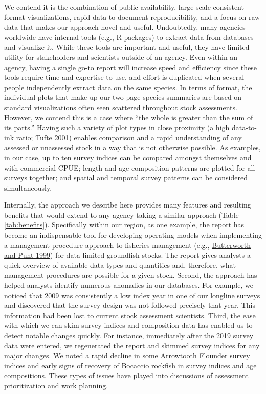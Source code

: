\documentclass[12pt,]{article}
\begin{document}
We contend it is the combination of public availability, large-scale consistent-format visualizations, rapid data-to-document reproducibility, and a focus on raw data that makes our approach novel and useful.
Undoubtedly, many agencies worldwide have internal tools (e.g., R packages) to extract data from databases and visualize it. While these tools are important and useful, they have limited utility for stakeholders and scientists outside of an agency. Even within an agency, having a single go-to report will increase speed and efficiency since
these tools require time and expertise to use, and effort is duplicated
when several people independently extract data on the same species.
In terms of format, the individual plots that make up our two-page species summaries are based on standard visualizations often seen scattered throughout stock assessments.
However, we contend this is a case where ``the whole is greater than the sum of its parts.''
Having such a variety of plot types in close proximity (a high data-to-ink ratio; \protect\hyperlink{ref-tufte2001}{Tufte 2001}) enables comparison and a rapid understanding of any assessed or unassessed stock in a way that is not otherwise possible.
As examples, in our case, up to ten survey indices can be compared amongst themselves and with commercial CPUE; length and age composition patterns are plotted for all surveys together; and spatial and temporal survey patterns can be considered simultaneously.

Internally, the approach we describe here provides many features and resulting benefits that would extend to any agency taking a similar approach (Table \ref{tab:benefits}).
Specifically within our region, as one example, the report has become an indispensable tool for developing operating models when implementing a management procedure approach to fisheries management (e.g., \protect\hyperlink{ref-butterworth1999}{Butterworth and Punt 1999}) for data-limited groundfish stocks.
The report gives analysts a quick overview of available data types and quantities and, therefore, what management procedures are possible for a given stock.
Second, the approach has helped analysts identify numerous anomalies in our databases.
For example, we noticed that 2009 was consistently a low index year in one of our longline surveys and discovered that the survey design was not followed precisely that year.
This information had been lost to current stock assessment scientists.
Third, the ease with which we can skim survey indices and composition data has enabled us to detect notable changes quickly.
For instance, immediately after the 2019 survey data were entered, we regenerated the report and skimmed survey indices for any major changes.
We noted a rapid decline in some Arrowtooth Flounder survey indices and early signs of recovery of Bocaccio rockfish in survey indices and age compositions. These types of issues have played into discussions of assessment prioritization and work planning.
\end{document}
